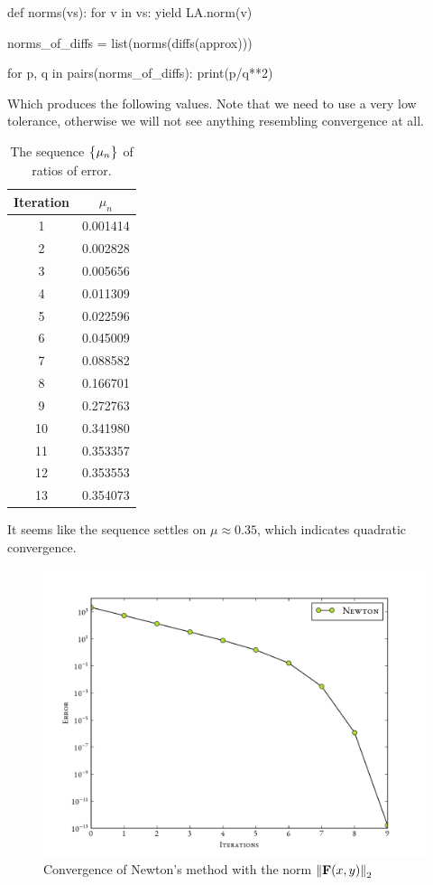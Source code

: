 \documentclass[12pt]{article}
\begin{document}
\begin{multicols}{2}
\begin{python}[
        caption={Computing the sequence of ratios}
    ]
def norms(vs):
        for v in vs: yield LA.norm(v)

norms_of_diffs = list(norms(diffs(approx)))

for p, q in pairs(norms_of_diffs):
    print(p/q**2)
    \end{python}
Which produces the following values.
Note that we need to use a very low tolerance,
otherwise we will not see anything resembling convergence at all.
    \begin{table}[H]
        \centering
        \caption{The sequence $\Seq{\mu_n}$ of ratios of error.}
        \begin{tabular}{c S[table-format=1.6]}
            \hline\hline
            \bfseries Iteration & $\mu_n$ \\
              & 0.001414\\
            2  & 0.002828\\
            3  & 0.005656\\
            4  & 0.011309\\
            5  & 0.022596\\
            6  & 0.045009\\
            7  & 0.088582\\
            8  & 0.166701\\
            9  & 0.272763\\
            10 & 0.341980\\
            11 & 0.353357\\
            12 & 0.353553\\
            13 & 0.354073\\
            \hline
        \end{tabular}
    \end{table}\noindent
    It seems like the sequence settles on $\mu \approx 0.35$,
    which indicates quadratic convergence.
    \begin{figure}[H]
        \centering
        \includegraphics[width=0.75\columnwidth]{f_norms}
        \caption{
            Convergence of Newton's method with the norm $\Norm[2]{\vec F(x, y)}$
        }
        \label{fig:f_norms}
    \end{figure}\noindent


\end{multicols}
\end{document}
